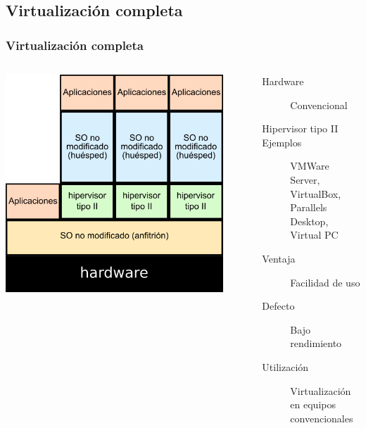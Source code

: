 \documentclass{beamer}
\begin{document}
\subsection{Virtualización completa}
\begin{frame} \frametitle{Virtualización completa}
  \begin{columns}
    \begin{center}
    \includegraphics[width=0.9\textwidth]{virt_completa.png}      
    \end{center}
    \begin{description}
    \item[Hardware] Convencional
    \item[Hipervisor tipo II]
    \item[Ejemplos] VMWare Server, VirtualBox,
      Parallels Desktop, Virtual PC
    \item [Ventaja] Facilidad de uso
    \item[Defecto] Bajo rendimiento
    \item[Utilización] Virtualización en equipos convencionales
    \end{description}
  \end{columns}
\end{frame}
\end{document}
